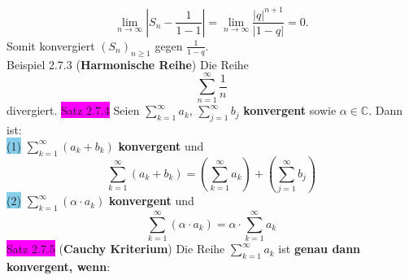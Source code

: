 \documentclass[landscape, 10pt]{article}
\newcommand{\C}{\mathbb{C}}
\begin{document}
\begin{multicols}{3}
\begin{equation*}
                            \lim\limits_{n\to\infty}|S_n-\frac{1}{1-1}|
                            =\lim\limits_{n\to\infty}\frac{|q|^{n+1}}{|1-q|}=0.
                     \end{equation*}
                     Somit konvergiert \textcolor{NavyBlue}{
                     $(S_n)_{n\geqslant1}$} gegen
                     \textcolor{NavyBlue}{$\frac{1}{1-q}$}.\\
              \colorbox{Dandelion}{Beispiel 2.7.3} 
              (\textbf{Harmonische Reihe}) 
                     Die Reihe
                     \begin{equation*}
                            \sum_{n=1}^\infty\frac{1}{n}
                     \end{equation*}
                     divergiert.
              \newpage
              \colorbox{magenta}{Satz 2.7.4} Seien 
                     \textcolor{NavyBlue}{$\sum_{k=1}^\infty a_k$},
                     \textcolor{NavyBlue}{$\sum_{j=1}^\infty b_j$}
                     \textbf{konvergent} sowie 
                     \textcolor{NavyBlue}{$\alpha\in\C$}. 
                     Dann ist:\\
                     \colorbox{SkyBlue}{(1)} 
                            \textcolor{NavyBlue}{
                            $\sum_{k=1}^\infty(a_k+b_k)$} 
                            \textbf{konvergent} und 
                            \begin{equation*}
                                   \sum_{k=1}^\infty(a_k+b_k)
                                   =(\sum_{k=1}^\infty a_k)
                                   +(\sum_{j=1}^\infty b_j)
                            \end{equation*}
                     \colorbox{SkyBlue}{(2)} 
                            \textcolor{NavyBlue}{
                            $\sum_{k=1}^\infty(\alpha\cdot a_k)$} 
                            \textbf{konvergent} und 
                            \begin{equation*}
                                   \sum_{k=1}^\infty
                                   (\alpha\cdot a_k)
                                   =\alpha\cdot
                                   \sum_{k=1}^\infty a_k
                            \end{equation*}
              \colorbox{magenta}{Satz 2.7.5} 
              (\textbf{Cauchy Kriterium}) 
                     Die Reihe 
                     \textcolor{NavyBlue}{
                     $\sum_{k=1}^\infty a_k$ }
                     ist \textbf{genau dann konvergent, wenn}:

\end{multicols}
\end{document}

